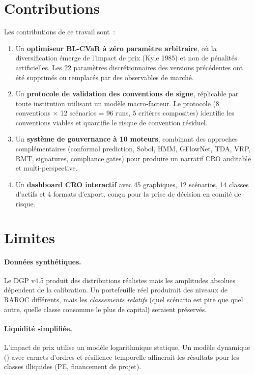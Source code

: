 \documentclass[12pt, a4paper, twoside, openright]{report}
\theoremstyle{definition}
\begin{document}
\section*{Contributions}

Les contributions de ce travail sont~:

\begin{enumerate}
\item Un \textbf{optimiseur BL-CVaR à zéro paramètre arbitraire}, où la diversification émerge de l'impact de prix (Kyle 1985) et non de pénalités artificielles. Les 22 paramètres discrétionnaires des versions précédentes ont été supprimés ou remplacés par des observables de marché.

\item Un \textbf{protocole de validation des conventions de signe}, réplicable par toute institution utilisant un modèle macro-facteur. Le protocole (8 conventions $\times$ 12 scénarios = 96 runs, 5 critères composites) identifie les conventions viables et quantifie le risque de convention résiduel.

\item Un \textbf{système de gouvernance à 10 moteurs}, combinant des approches complémentaires (conformal prediction, Sobol, HMM, GFlowNet, TDA, VRP, RMT, signatures, compliance gates) pour produire un narratif CRO auditable et multi-perspective.

\item Un \textbf{dashboard CRO interactif} avec 45 graphiques, 12 scénarios, 14 classes d'actifs et 4 formats d'export, conçu pour la prise de décision en comité de risque.
\end{enumerate}

\section*{Limites}

\paragraph{Données synthétiques.} Le DGP v4.5 produit des distributions réalistes mais les amplitudes absolues dépendent de la calibration. Un portefeuille réel produirait des niveaux de RAROC différents, mais les \emph{classements relatifs} (quel scénario est pire que quel autre, quelle classe consomme le plus de capital) seraient préservés.

\paragraph{Liquidité simplifiée.} L'impact de prix utilise un modèle logarithmique statique. Un modèle dynamique (\citealt{almgren2001}) avec carnets d'ordres et résilience temporelle affinerait les résultats pour les classes illiquides (PE, financement de projet).
\end{document}
